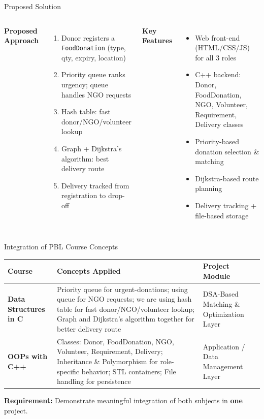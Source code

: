 \documentclass[aspectratio=169,11pt]{beamer}
\begin{document}
\begin{frame}{Proposed Solution}
\begin{columns}[T,totalwidth=\textwidth]
\small
\textbf{\color{GEUBlue}Proposed Approach}
\begin{enumerate}\itemsep2pt
\item Donor registers a \texttt{FoodDonation} (type, qty, expiry, location)
\item Priority queue ranks urgency; queue handles NGO requests
\item Hash table: fast donor/NGO/volunteer lookup
\item Graph + Dijkstra's algorithm: best delivery route
\item Delivery tracked from registration to drop-off
\end{enumerate}
\small
\textbf{\color{GEUBlue}Key Features}
\begin{itemize}\itemsep2pt
\item Web front-end (HTML/CSS/JS) for all 3 roles
\item C++ backend: Donor, FoodDonation, NGO, Volunteer, Requirement, Delivery classes
\item Priority-based donation selection \& matching
\item Dijkstra-based route planning
\item Delivery tracking + file-based storage
\end{itemize}
\end{columns}
\vfill
\end{frame}

\begin{frame}{Integration of PBL Course Concepts}
\scriptsize
\begin{center}
\renewcommand{\arraystretch}{1.25}
\begin{tabularx}{.96\textwidth}{@{}>{\bfseries}p{3.0cm}X p{2.5cm}@{}}
\toprule
Course & Concepts Applied & Project Module\\
\midrule
Data Structures in C & Priority queue for urgent-donations; using queue for NGO requests; we are using hash table for fast donor/NGO/volunteer lookup; Graph and Dijkstra's algorithm together for better delivery route & DSA-Based Matching \& Optimization Layer\\
OOPs with C++ & Classes: Donor, FoodDonation, NGO, Volunteer, Requirement, Delivery; Inheritance \& Polymorphism for role-specific behavior; STL containers; File handling for persistence & Application / Data Management Layer\\
\bottomrule
\end{tabularx}
\end{center}
\vfill
\begin{center}
\colorbox{GEULightBlue}{\parbox{.86\textwidth}{\centering
\textbf{Requirement:} Demonstrate meaningful integration of both subjects in \textbf{one} project.}}
\end{center}
\end{frame}
\end{document}
